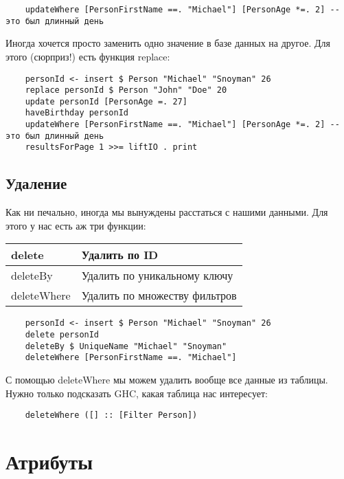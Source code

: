 \begin{lstlisting}
    updateWhere [PersonFirstName ==. "Michael"] [PersonAge *=. 2] -- это был длинный день
\end{lstlisting}

Иногда хочется просто заменить одно значение в базе данных на другое. Для этого (сюрприз!) есть функция replace:

\begin{lstlisting}
    personId <- insert $ Person "Michael" "Snoyman" 26
    replace personId $ Person "John" "Doe" 20
    update personId [PersonAge =. 27]
    haveBirthday personId
    updateWhere [PersonFirstName ==. "Michael"] [PersonAge *=. 2] -- это был длинный день
    resultsForPage 1 >>= liftIO . print
\end{lstlisting}%

\subsection{Удаление} %

Как ни печально, иногда мы вынуждены расстаться с нашими данными. Для этого у нас есть аж три функции:

\begin{center}
\begin{tabular}{ | l | l |}
\hline
delete & Удалить по ID \\ \hline
deleteBy & Удалить по уникальному ключу \\ \hline
deleteWhere & Удалить по множеству фильтров \\ \hline
\end{tabular}
\end{center}

\begin{lstlisting}
    personId <- insert $ Person "Michael" "Snoyman" 26
    delete personId
    deleteBy $ UniqueName "Michael" "Snoyman"
    deleteWhere [PersonFirstName ==. "Michael"]
\end{lstlisting}%

С помощью deleteWhere мы можем удалить вообще все данные из таблицы. Нужно только подсказать GHC, какая таблица нас интересует:

\begin{lstlisting}
    deleteWhere ([] :: [Filter Person])
\end{lstlisting}

\section{Атрибуты} %

